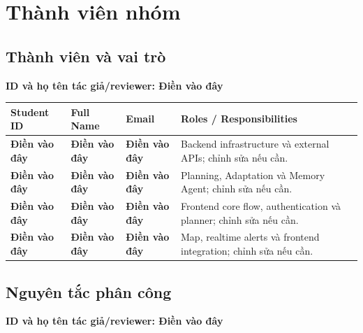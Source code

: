 \documentclass[12pt,a4paper]{article}
\newcommand{\dienvao}{\textbf{Điền vào đây}}
\newcommand{\tacgia}{%
  \begin{tcolorbox}[colback=blue!3,colframe=blue!25,boxrule=0.4pt,arc=1mm]
    \small\textbf{ID và họ tên tác giả/reviewer: Điền vào đây}
  \end{tcolorbox}
}
\begin{document}
\newpage
\pagestyle{fancy}
\setcounter{page}{1}
\renewcommand{\contentsname}{\centerline{MỤC LỤC}}
\tableofcontents
\newpage

\renewcommand{\listfigurename}{\centerline{DANH SÁCH HÌNH ẢNH}}
\listoffigures
\newpage

\renewcommand{\listtablename}{\centerline{DANH SÁCH BẢNG BIỂU}}
\listoftables
\newpage

\setcounter{page}{1}

\section{Thành viên nhóm}

\subsection{Thành viên và vai trò}
\tacgia

\begin{longtable}{|C{2.5cm}|C{3.5cm}|C{4.0cm}|C{5.0cm}|}
\hline
\textbf{Student ID} & \textbf{Full Name} & \textbf{Email} & \textbf{Roles / Responsibilities} \\ \hline
\endhead
\dienvao & \dienvao & \dienvao & Backend infrastructure và external APIs; chỉnh sửa nếu cần. \\ \hline
\dienvao & \dienvao & \dienvao & Planning, Adaptation và Memory Agent; chỉnh sửa nếu cần. \\ \hline
\dienvao & \dienvao & \dienvao & Frontend core flow, authentication và planner; chỉnh sửa nếu cần. \\ \hline
\dienvao & \dienvao & \dienvao & Map, realtime alerts và frontend integration; chỉnh sửa nếu cần. \\ \hline
\end{longtable}

\subsection{Nguyên tắc phân công}
\tacgia
\end{document}
